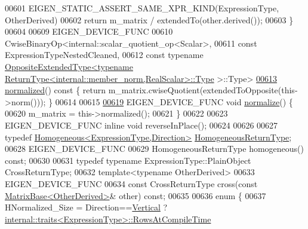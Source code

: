 \begin{DoxyCode}
00601       EIGEN\_STATIC\_ASSERT\_SAME\_XPR\_KIND(ExpressionType, OtherDerived)
00602       \textcolor{keywordflow}{return} m\_matrix / extendedTo(other.derived());
00603     \}
00604 
00609     EIGEN\_DEVICE\_FUNC
00610     CwiseBinaryOp<internal::scalar\_quotient\_op<Scalar>,
00611                   \textcolor{keyword}{const} ExpressionTypeNestedCleaned,
00612                   \textcolor{keyword}{const} \textcolor{keyword}{typename} 
      \hyperlink{struct_eigen_1_1_vectorwise_op_1_1_opposite_extended_type}{OppositeExtendedType<typename ReturnType<internal::member\_norm,RealScalar>::Type}
      >::Type>
\hyperlink{group___core___module_a38799c77ec92e4b856804b7f0bc35c67}{00613}     \hyperlink{group___core___module_a38799c77ec92e4b856804b7f0bc35c67}{normalized}()\textcolor{keyword}{ const }\{ \textcolor{keywordflow}{return} m\_matrix.cwiseQuotient(extendedToOpposite(this->norm())); \}
00614 
00615 
\hyperlink{group___core___module_a1d22c9442537bd654edb4604db7b7b57}{00619}     EIGEN\_DEVICE\_FUNC \textcolor{keywordtype}{void} \hyperlink{group___core___module_a1d22c9442537bd654edb4604db7b7b57}{normalize}() \{
00620       m\_matrix = this->normalized();
00621     \}
00622 
00623     EIGEN\_DEVICE\_FUNC \textcolor{keyword}{inline} \textcolor{keywordtype}{void} reverseInPlace();
00624 
00626 
00627     \textcolor{keyword}{typedef} \hyperlink{group___geometry___module_class_eigen_1_1_homogeneous}{Homogeneous<ExpressionType,Direction>} 
      \hyperlink{group___geometry___module_class_eigen_1_1_homogeneous}{HomogeneousReturnType};
00628     EIGEN\_DEVICE\_FUNC
00629     HomogeneousReturnType homogeneous() \textcolor{keyword}{const};
00630 
00631     \textcolor{keyword}{typedef} \textcolor{keyword}{typename} ExpressionType::PlainObject CrossReturnType;
00632     \textcolor{keyword}{template}<\textcolor{keyword}{typename} OtherDerived>
00633     EIGEN\_DEVICE\_FUNC
00634     \textcolor{keyword}{const} CrossReturnType cross(\textcolor{keyword}{const} \hyperlink{group___core___module_class_eigen_1_1_matrix_base}{MatrixBase<OtherDerived>}& other) \textcolor{keyword}{const};
00635 
00636     \textcolor{keyword}{enum} \{
00637       HNormalized\_Size = Direction==\hyperlink{group__enums_ggad49a7b3738e273eb00932271b36127f7addca718e0564723df21d61b94b1198be}{Vertical} ? 
      \hyperlink{struct_eigen_1_1internal_1_1traits}{internal::traits<ExpressionType>::RowsAtCompileTime}

\end{DoxyCode}
